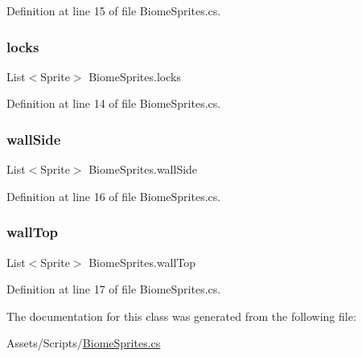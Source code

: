 Definition at line 15 of file Biome\+Sprites.\+cs.

\mbox{\label{class_biome_sprites_a9965a03afe286f1989281b3ccc3c6d51}} 
\subsubsection{\texorpdfstring{locks}{locks}}
{\footnotesize\ttfamily List$<$Sprite$>$ Biome\+Sprites.\+locks}



Definition at line 14 of file Biome\+Sprites.\+cs.

\mbox{\label{class_biome_sprites_ae50f2ead3749017429753f14a0acf8ff}} 
\subsubsection{\texorpdfstring{wallSide}{wallSide}}
{\footnotesize\ttfamily List$<$Sprite$>$ Biome\+Sprites.\+wall\+Side}



Definition at line 16 of file Biome\+Sprites.\+cs.

\mbox{\label{class_biome_sprites_a4653b5307c630bec66c3b4c14f8d54f0}} 
\subsubsection{\texorpdfstring{wallTop}{wallTop}}
{\footnotesize\ttfamily List$<$Sprite$>$ Biome\+Sprites.\+wall\+Top}



Definition at line 17 of file Biome\+Sprites.\+cs.



The documentation for this class was generated from the following file\+:\begin{DoxyCompactItemize}
\item 
Assets/\+Scripts/\mbox{\hyperlink{_biome_sprites_8cs}{Biome\+Sprites.\+cs}}\end{DoxyCompactItemize}
